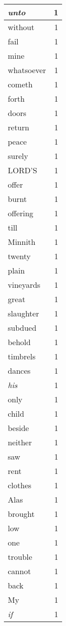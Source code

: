 \begin{center}
\begin{longtable}{l|r}
\emph{unto} & 1\\ \hline 
without & 1\\ \hline 
fail & 1\\ \hline 
mine & 1\\ \hline 
whatsoever & 1\\ \hline 
cometh & 1\\ \hline 
forth & 1\\ \hline 
doors & 1\\ \hline 
return & 1\\ \hline 
peace & 1\\ \hline 
surely & 1\\ \hline 
LORD'S & 1\\ \hline 
offer & 1\\ \hline 
burnt & 1\\ \hline 
offering & 1\\ \hline 
till & 1\\ \hline 
Minnith & 1\\ \hline 
twenty & 1\\ \hline 
plain & 1\\ \hline 
vineyards & 1\\ \hline 
great & 1\\ \hline 
slaughter & 1\\ \hline 
subdued & 1\\ \hline 
behold & 1\\ \hline 
timbrels & 1\\ \hline 
dances & 1\\ \hline 
\emph{his} & 1\\ \hline 
only & 1\\ \hline 
child & 1\\ \hline 
beside & 1\\ \hline 
neither & 1\\ \hline 
saw & 1\\ \hline 
rent & 1\\ \hline 
clothes & 1\\ \hline 
Alas & 1\\ \hline 
brought & 1\\ \hline 
low & 1\\ \hline 
one & 1\\ \hline 
trouble & 1\\ \hline 
cannot & 1\\ \hline 
back & 1\\ \hline 
My & 1\\ \hline 
\emph{if} & 1\\ \hline 

\end{longtable}
\end{center}
